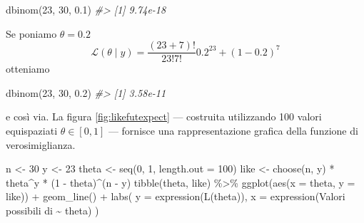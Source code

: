 \documentclass[
  10pt,
  italian,
  a4paper,
  extrafontsizes,onecolumn,openright
  ]{memoir}
\newenvironment{Shaded}{\begin{snugshade}}{\end{snugshade}}
\newcommand{\AttributeTok}[1]{\textcolor[rgb]{0.77,0.63,0.00}{#1}}
\newcommand{\CommentTok}[1]{\textcolor[rgb]{0.56,0.35,0.01}{\textit{#1}}}
\newcommand{\DecValTok}[1]{\textcolor[rgb]{0.00,0.00,0.81}{#1}}
\newcommand{\FloatTok}[1]{\textcolor[rgb]{0.00,0.00,0.81}{#1}}
\newcommand{\FunctionTok}[1]{\textcolor[rgb]{0.00,0.00,0.00}{#1}}
\newcommand{\NormalTok}[1]{#1}
\newcommand{\OtherTok}[1]{\textcolor[rgb]{0.56,0.35,0.01}{#1}}
\newcommand{\SpecialCharTok}[1]{\textcolor[rgb]{0.00,0.00,0.00}{#1}}
\newcommand{\StringTok}[1]{\textcolor[rgb]{0.31,0.60,0.02}{#1}}
\theoremstyle{definition}
\theoremstyle{definition}
\theoremstyle{definition}
\theoremstyle{definition}
\theoremstyle{remark}
\begin{document}
\begin{Shaded}
\begin{Highlighting}[]
\FunctionTok{dbinom}\NormalTok{(}\DecValTok{23}\NormalTok{, }\DecValTok{30}\NormalTok{, }\FloatTok{0.1}\NormalTok{)}
\CommentTok{\#\textgreater{} [1] 9.74e{-}18}
\end{Highlighting}
\end{Shaded}

\noindent
Se poniamo \(\theta = 0.2\)
\[
\mathcal{L}(\theta \mid y) = \frac{(23 + 7)!}{23!7!} 0.2^{23} + (1-0.2)^7
\]
\noindent
otteniamo

\begin{Shaded}
\begin{Highlighting}[]
\FunctionTok{dbinom}\NormalTok{(}\DecValTok{23}\NormalTok{, }\DecValTok{30}\NormalTok{, }\FloatTok{0.2}\NormalTok{)}
\CommentTok{\#\textgreater{} [1] 3.58e{-}11}
\end{Highlighting}
\end{Shaded}

\noindent
e così via. La figura \ref{fig:likefutexpect} --- costruita utilizzando 100 valori equispaziati \(\theta \in [0, 1]\) --- fornisce una rappresentazione grafica della funzione di verosimiglianza.

\begin{Shaded}
\begin{Highlighting}[]
\NormalTok{n }\OtherTok{\textless{}{-}} \DecValTok{30}
\NormalTok{y }\OtherTok{\textless{}{-}} \DecValTok{23}
\NormalTok{theta }\OtherTok{\textless{}{-}} \FunctionTok{seq}\NormalTok{(}\DecValTok{0}\NormalTok{, }\DecValTok{1}\NormalTok{, }\AttributeTok{length.out =} \DecValTok{100}\NormalTok{)}
\NormalTok{like }\OtherTok{\textless{}{-}} \FunctionTok{choose}\NormalTok{(n, y) }\SpecialCharTok{*}\NormalTok{ theta}\SpecialCharTok{\^{}}\NormalTok{y }\SpecialCharTok{*}\NormalTok{ (}\DecValTok{1} \SpecialCharTok{{-}}\NormalTok{ theta)}\SpecialCharTok{\^{}}\NormalTok{(n }\SpecialCharTok{{-}}\NormalTok{ y)}
\FunctionTok{tibble}\NormalTok{(theta, like) }\SpecialCharTok{\%\textgreater{}\%} 
  \FunctionTok{ggplot}\NormalTok{(}\FunctionTok{aes}\NormalTok{(}\AttributeTok{x =}\NormalTok{ theta, }\AttributeTok{y =}\NormalTok{ like)) }\SpecialCharTok{+}
  \FunctionTok{geom\_line}\NormalTok{() }\SpecialCharTok{+}
  \FunctionTok{labs}\NormalTok{(}
    \AttributeTok{y =} \FunctionTok{expression}\NormalTok{(}\FunctionTok{L}\NormalTok{(theta)),}
    \AttributeTok{x =} \FunctionTok{expression}\NormalTok{(}\StringTok{\textquotesingle{}Valori possibili di\textquotesingle{}} \SpecialCharTok{\textasciitilde{}}\NormalTok{ theta)}
\NormalTok{  )}
\end{Highlighting}
\end{Shaded}
\end{document}
